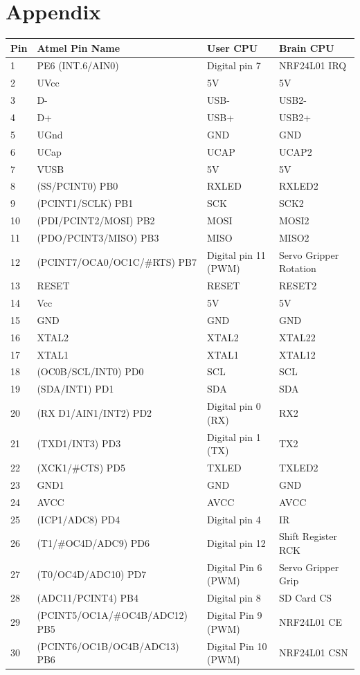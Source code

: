 \documentclass[11pt,a4paper]{article}
\begin{document}
\section{Appendix}

\begin{longtable}{p{}p{}p{}p{}}
\toprule
Pin&Atmel Pin Name&User CPU&Brain CPU\\
\midrule
1&PE6 (INT.6/AIN0)&Digital pin 7&NRF24L01 IRQ\\
2&UVcc&5V&5V\\
3&D-&USB-&USB2-\\
4&D+&USB+&USB2+\\
5&UGnd&GND&GND\\
6&UCap&UCAP&UCAP2\\
7&VUSB&5V&5V\\
8&(SS/PCINT0) PB0&RXLED&RXLED2\\
9&(PCINT1/SCLK) PB1&SCK&SCK2\\
10&(PDI/PCINT2/MOSI) PB2&MOSI&MOSI2\\
11&(PDO/PCINT3/MISO) PB3&MISO&MISO2\\
12&(PCINT7/OCA0/OC1C/\#RTS) PB7&Digital pin 11 (PWM)&Servo Gripper Rotation\\
13&RESET&RESET&RESET2\\
14&Vcc&5V&5V\\
15&GND&GND&GND\\
16&XTAL2&XTAL2&XTAL22\\
17&XTAL1&XTAL1&XTAL12\\
18&(OC0B/SCL/INT0) PD0&SCL&SCL\\
19&(SDA/INT1) PD1&SDA&SDA\\
20&(RX D1/AIN1/INT2) PD2&Digital pin 0 (RX)&RX2\\
21&(TXD1/INT3) PD3&Digital pin 1 (TX)&TX2\\
22&(XCK1/\#CTS) PD5&TXLED&TXLED2\\
23&GND1&GND&GND\\
24&AVCC&AVCC&AVCC\\
25&(ICP1/ADC8) PD4&Digital pin 4&IR\\
26&(T1/\#OC4D/ADC9) PD6&Digital pin 12&Shift Register RCK\\
27&(T0/OC4D/ADC10) PD7&Digital Pin 6 (PWM)&Servo Gripper Grip\\
28&(ADC11/PCINT4) PB4&Digital pin 8&SD Card CS\\
29&(PCINT5/OC1A/\#OC4B/ADC12) PB5&Digital Pin 9 (PWM)&NRF24L01 CE\\
30&(PCINT6/OC1B/OC4B/ADC13) PB6&Digital Pin 10 (PWM)&NRF24L01 CSN\\

\end{longtable}
\end{document}
